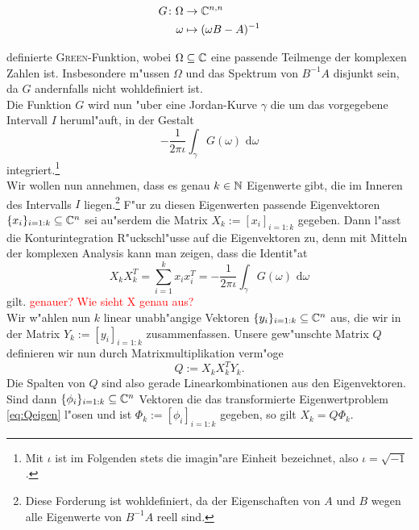 
  \begin{align*}
  G\colon\Omega &\to\mathbb{C}^{n,n}\\
  \omega &\mapsto (\omega B - A)^{-1}
  \end{align*}

definierte \textsc{Green}-Funktion, wobei $\Omega \subseteq \mathbb{C}$ eine passende
Teilmenge der komplexen Zahlen ist. Insbesondere m"ussen $\Omega$ und das
Spektrum von $B^{-1}A$ disjunkt sein, da $G$ andernfalls nicht wohldefiniert ist.\\

Die Funktion $G$ wird nun "uber eine Jordan-Kurve $\gamma$%
die um das vorgegebene Intervall $I$ heruml"auft, in der Gestalt
\[
-\frac{1}{2\pi\iota}\int_\gamma G(\omega)\text{ d}\omega
\]
integriert.\footnote{Mit $\iota$ ist im Folgenden stets die imagin"are Einheit bezeichnet,
also $\iota = \sqrt{-1}$.}\\

Wir wollen nun annehmen,
dass es genau $k\in\mathbb{N}$ Eigenwerte gibt,
die im Inneren des Intervalls $I$ liegen.\footnote{Diese Forderung ist wohldefiniert, da
der Eigenschaften von $A$ und $B$ wegen alle Eigenwerte von $B^{-1}A$ reell sind.}
F"ur zu diesen Eigenwerten passende Eigenvektoren $\{x_i\}_{i=1:k} \subseteq \mathbb{C}^n$ sei au"serdem die Matrix
$X_k := [x_i]_{i=1:k}$ gegeben.
Dann l"asst die Konturintegration R"uckschl"usse auf die Eigenvektoren zu, denn mit
Mitteln der komplexen Analysis kann man
zeigen, dass die Identit"at
\begin{equation}\label{eq:integral}
X_k X_k^T = \sum_{i=1}^k x_i x_i^T =
-\frac{1}{2\pi\iota}\int_\gamma G(\omega)\text{ d}\omega
\end{equation}
gilt. \textcolor{red}{genauer? Wie sieht X genau aus?}\\

Wir w"ahlen nun $k$ linear unabh"angige Vektoren $\{y_i\}_{i=1:k} \subseteq \mathbb{C}^n$
aus, die wir in der Matrix $Y_k := [ y_i ]_{i=1:k}$ zusammenfassen.
Unsere gew"unschte Matrix $Q$ definieren wir nun durch Matrixmultiplikation
verm"oge
\begin{equation}\label{eq:Q}
Q := X_k X_k^T Y_k.
\end{equation}
Die Spalten von $Q$ sind also gerade Linearkombinationen aus den Eigenvektoren.
Sind dann $\{\phi_i\}_{i=1:k} \subseteq \mathbb{C}^n$ Vektoren die das transformierte
Eigenwertproblem \eqref{eq:Qeigen} l"osen
und ist $\Phi_k:=[\phi_i]_{i=1:k}$ gegeben,
so gilt $X_k = Q \Phi_k$.\\

